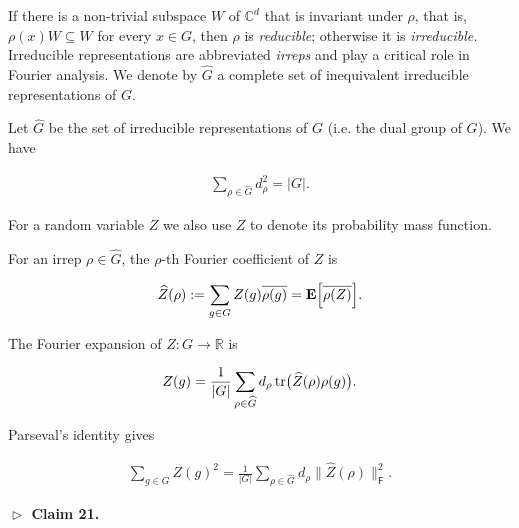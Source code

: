 If there is a non-trivial subspace $W$ of $\mathbb{C}^{d}$ that
is invariant under $\rho$, that is, $\rho(x)W\subseteq W$ for every
$x\in G$, then $\rho$ is \emph{reducible}; otherwise it is \emph{irreducible.}
Irreducible representations are abbreviated \emph{irreps }and play
a critical role in Fourier analysis. We denote by $\widehat{G}$ a
complete set of inequivalent irreducible representations of $G$.\par




Let $\widehat{G}$ be the set of irreducible representations of $G$ (i.e. the dual group of $G$).
We have\par


\[\begin{gathered}
\sum_{\rho\in\widehat{G}}d^{2}_{\rho}=|G|.
\end{gathered}\]




For a random variable $Z$ we also use $Z$ to denote its probability mass function.\par




For an irrep $\rho\in\widehat{G}$, the $\rho$-th Fourier coefficient of $Z$ is\par


\[\begin{gathered}
\widehat{Z}(\rho):=\sum_{g\in G}Z(g)\overline{\rho(g)}=\mathop{\bf E\/}\Bigl{[}\overline{\rho(Z)}\Bigr{]}.
\end{gathered}\]


The Fourier expansion of $Z\colon G\to\mathbb{R}$ is\par


\[\begin{gathered}
Z(g)=\frac{1}{\lvert G\rvert}\sum_{\rho\in\widehat{G}}d_{\rho}\operatorname{tr}\bigl{(}\widehat{Z}(\rho)\rho(g)\bigr{)}.
\end{gathered}\]


Parseval’s identity gives\par


\[\begin{gathered}
\sum_{g\in G}Z(g)^{2}=\frac{1}{\lvert G\rvert}\sum_{\rho\in\widehat{G}}d_{\rho}\lVert\widehat{Z}(\rho)\rVert_{\mathsf{F}}^{2}.
\end{gathered}\]





\par\medskip\noindent\textbf{
$\vartriangleright$ Claim 21. }\par



